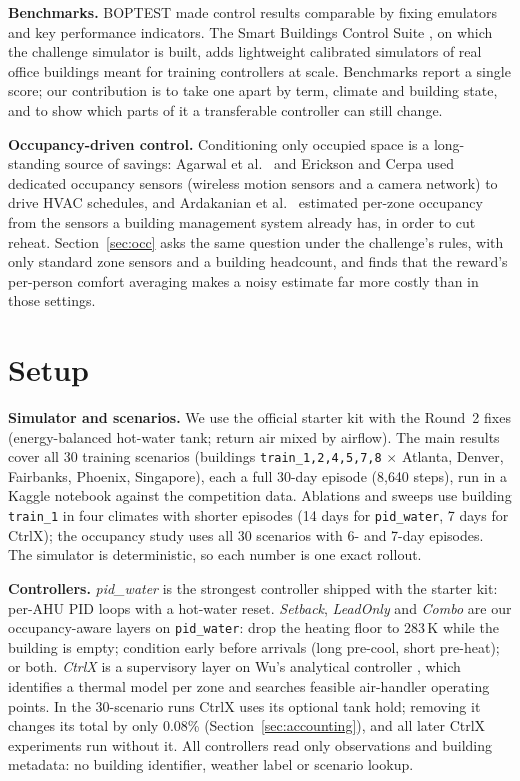 \documentclass{article}
\begin{document}
\textbf{Benchmarks.} BOPTEST \cite{blum2021} made control results comparable by fixing emulators and key performance indicators. The Smart Buildings Control Suite \cite{goldfeder2023,goldfeder2025}, on which the challenge simulator is built, adds lightweight calibrated simulators of real office buildings meant for training controllers at scale. Benchmarks report a single score; our contribution is to take one apart by term, climate and building state, and to show which parts of it a transferable controller can still change.

\textbf{Occupancy-driven control.} Conditioning only occupied space is a long-standing source of savings: Agarwal et al.\ \cite{agarwal2010} and Erickson and Cerpa \cite{erickson2010} used dedicated occupancy sensors (wireless motion sensors and a camera network) to drive HVAC schedules, and Ardakanian et al.\ \cite{ardakanian2016} estimated per-zone occupancy from the sensors a building management system already has, in order to cut reheat. Section~\ref{sec:occ} asks the same question under the challenge's rules, with only standard zone sensors and a building headcount, and finds that the reward's per-person comfort averaging makes a noisy estimate far more costly than in those settings.

\section{Setup}
\textbf{Simulator and scenarios.} We use the official starter kit with the Round~2 fixes (energy-balanced hot-water tank; return air mixed by airflow). The main results cover all 30 training scenarios (buildings \texttt{train\_1,2,4,5,7,8} $\times$ Atlanta, Denver, Fairbanks, Phoenix, Singapore), each a full 30-day episode (8{,}640 steps), run in a Kaggle notebook against the competition data. Ablations and sweeps use building \texttt{train\_1} in four climates with shorter episodes (14 days for \texttt{pid\_water}, 7 days for CtrlX); the occupancy study uses all 30 scenarios with 6- and 7-day episodes. The simulator is deterministic, so each number is one exact rollout.

\textbf{Controllers.}
\emph{pid\_water} is the strongest controller shipped with the starter kit: per-AHU PID loops with a hot-water reset.
\emph{Setback}, \emph{LeadOnly} and \emph{Combo} are our occupancy-aware layers on \texttt{pid\_water}: drop the heating floor to 283\,K while the building is empty; condition early before arrivals (long pre-cool, short pre-heat); or both.
\emph{CtrlX} \cite{morev2026} is a supervisory layer on Wu's analytical controller \cite{wu2026}, which identifies a thermal model per zone and searches feasible air-handler operating points. In the 30-scenario runs CtrlX uses its optional tank hold; removing it changes its total by only 0.08\% (Section~\ref{sec:accounting}), and all later CtrlX experiments run without it. All controllers read only observations and building metadata: no building identifier, weather label or scenario lookup.
\end{document}
